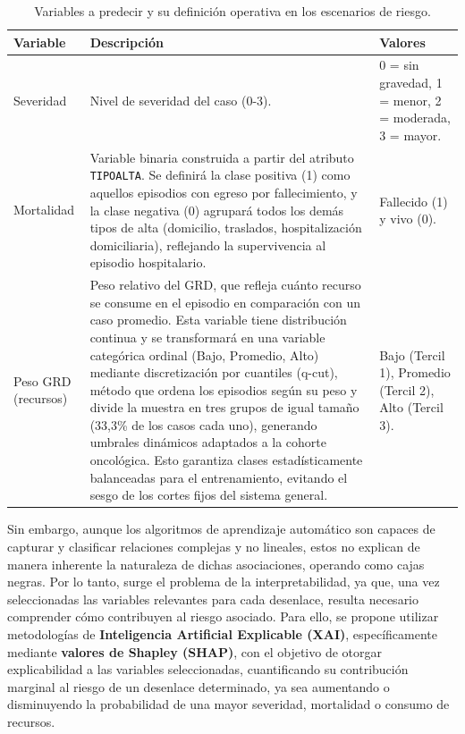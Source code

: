\begin{table}[htbp]
\centering
\footnotesize
\setlength{\tabcolsep}{4pt}
\renewcommand{\arraystretch}{1.15}
\caption{Variables a predecir y su definición operativa en los escenarios de riesgo.}
\label{tab:variables_a_predecir}
\begin{tabular}{|l|l|l|}
\hline
\parbox[t]{2.55cm}{\textbf{Variable}} & \parbox[t]{6.15cm}{\textbf{Descripción}} & \parbox[t]{4.05cm}{\textbf{Valores}} \\ \hline
\parbox[t]{2.55cm}{Severidad} & \parbox[t]{6.15cm}{Nivel de severidad del caso (0-3).} & \parbox[t]{4.05cm}{0 = sin gravedad, 1 = menor, 2 = moderada, 3 = mayor.} \\ \hline
\parbox[t]{2.55cm}{Mortalidad} & \parbox[t]{6.15cm}{Variable binaria construida a partir del atributo \texttt{TIPOALTA}. Se definirá la clase positiva (1) como aquellos episodios con egreso por fallecimiento, y la clase negativa (0) agrupará todos los demás tipos de alta (domicilio, traslados, hospitalización domiciliaria), reflejando la supervivencia al episodio hospitalario.} & \parbox[t]{4.05cm}{Fallecido (1) y vivo (0).} \\ \hline
\parbox[t]{2.55cm}{Peso GRD (recursos)} & \parbox[t]{6.15cm}{Peso relativo del GRD, que refleja cuánto recurso se consume en el episodio en comparación con un caso promedio. Esta variable tiene distribución continua y se transformará en una variable categórica ordinal (Bajo, Promedio, Alto) mediante discretización por cuantiles (q-cut), método que ordena los episodios según su peso y divide la muestra en tres grupos de igual tamaño (33,3\% de los casos cada uno), generando umbrales dinámicos adaptados a la cohorte oncológica. Esto garantiza clases estadísticamente balanceadas para el entrenamiento, evitando el sesgo de los cortes fijos del sistema general.} & \parbox[t]{4.05cm}{Bajo (Tercil 1), Promedio (Tercil 2), Alto (Tercil 3).} \\ \hline
\end{tabular}
\end{table}

Sin embargo, aunque los algoritmos de aprendizaje automático son capaces de capturar y clasificar relaciones complejas y no lineales, estos no explican de manera inherente la naturaleza de dichas asociaciones, operando como cajas negras. Por lo tanto, surge el problema de la interpretabilidad, ya que, una vez seleccionadas las variables relevantes para cada desenlace, resulta necesario comprender cómo contribuyen al riesgo asociado. Para ello, se propone utilizar metodologías de \textbf{Inteligencia Artificial Explicable (XAI)}, específicamente mediante \textbf{valores de Shapley (SHAP)}, con el objetivo de otorgar explicabilidad a las variables seleccionadas, cuantificando su contribución marginal al riesgo de un desenlace determinado, ya sea aumentando o disminuyendo la probabilidad de una mayor severidad, mortalidad o consumo de recursos.

